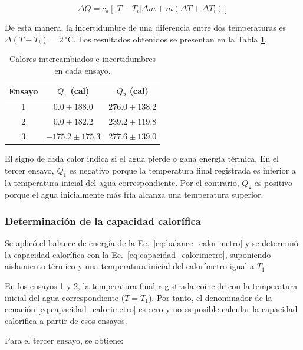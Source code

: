\begin{equation}
    \Delta Q=c_a\left[
    |T-T_i|\Delta m+
    m(\Delta T+\Delta T_i)
    \right]
    \label{eq:incertidumbre_calor}
\end{equation}

De esta manera, la incertidumbre de una diferencia entre dos temperaturas es $\Delta(T-T_i)=2\,^\circ\mathrm{C}$. Los resultados obtenidos se presentan en la Tabla \ref{tab:calores_capacidad}.

\begin{table}[H]
    \centering
    \caption{Calores intercambiados e incertidumbres en cada ensayo.}
    \label{tab:calores_capacidad}
    \begin{tabular}{ccc}
        \toprule
        Ensayo & $Q_1$ (cal) & $Q_2$ (cal) \\
        \midrule
        1 & $0.0 \pm 188.0$ & $276.0 \pm 138.2$ \\
        2 & $0.0 \pm 182.2$ & $239.2 \pm 119.8$ \\
        3 & $-175.2 \pm 175.3$ & $277.6 \pm 139.0$ \\
        \bottomrule
    \end{tabular}
\end{table}

El signo de cada calor indica si el agua pierde o gana energía térmica. En el tercer ensayo, $Q_1$ es negativo porque la temperatura final registrada es inferior a la temperatura inicial del agua correspondiente. Por el contrario, $Q_2$ es positivo porque el agua inicialmente más fría alcanza una temperatura superior.

\subsubsection{Determinación de la capacidad calorífica}

Se aplicó el balance de energía de la Ec.~\eqref{eq:balance_calorimetro} y se determinó la capacidad calorífica con la Ec.~\eqref{eq:capacidad_calorimetro}, suponiendo aislamiento térmico y una temperatura inicial del calorímetro igual a $T_1$.

En los ensayos 1 y 2, la temperatura final registrada coincide con la temperatura inicial del agua correspondiente ($T=T_1$). Por tanto, el denominador de la ecuación \ref{eq:capacidad_calorimetro} es cero y no es posible calcular la capacidad calorífica a partir de esos ensayos.

Para el tercer ensayo, se obtiene:

